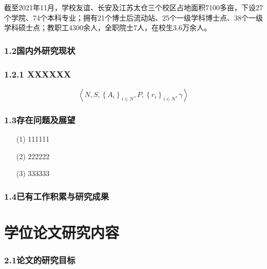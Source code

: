\documentclass{article}
\begin{document}
截至2021年11月，学校友谊、长安及江苏太仓三个校区占地面积7100多亩，下设27个学院、74个本科专业；拥有21个博士后流动站、25个一级学科博士点、38个一级学科硕士点；教职工4300余人，全职院士7人，在校生3.6万余人\cite{nwpu2020,da2019survey}。




\subsubsection*{1.2国内外研究现状}





\subsubsection*{1.2.1 XXXXXX}

\begin{equation}
	\left \langle N,S,\left \{ A_{i}  \right \}_{i\in N},P,\left \{ r_{i}  \right \}_{i\in N},\gamma    \right \rangle \tag{1-1}
	\label{Equ.1}
\end{equation}




\subsubsection*{1.3存在问题及展望}

\begin{enumerate}
	\item[(1)] 111111
	\item[(2)] 222222
	\item[(3)] 333333
\end{enumerate}


\subsubsection*{1.4已有工作积累与研究成果}
	

\newpage
\newpage


\newpage
\section{学位论文研究内容}
\subsubsection*{2.1论文的研究目标}
\end{document}

